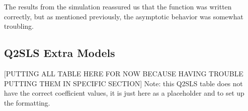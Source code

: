 \documentclass[12pt]{article}
\begin{document}
The results from the simulation reassured us that the function was written correctly, but as mentioned previously, the asymptotic behavior was somewhat troubling.


\subsection{Q2SLS Extra Models} \label{appendix_q2sls}

\textcolor{BrickRed}{[PUTTING ALL TABLE HERE FOR NOW BECAUSE HAVING TROUBLE PUTTING THEM IN SPECIFIC SECTION]} Note: this Q2SLS table does not have the correct coefficient values, it is just here as a placeholder and to set up the formatting.

\begin{table}[H] \centering
  \caption{Addressing Endogeneity - WRONG VALUES (JUST PLACEHOLDER FOR NOW)}  
\end{table}
\end{document}
